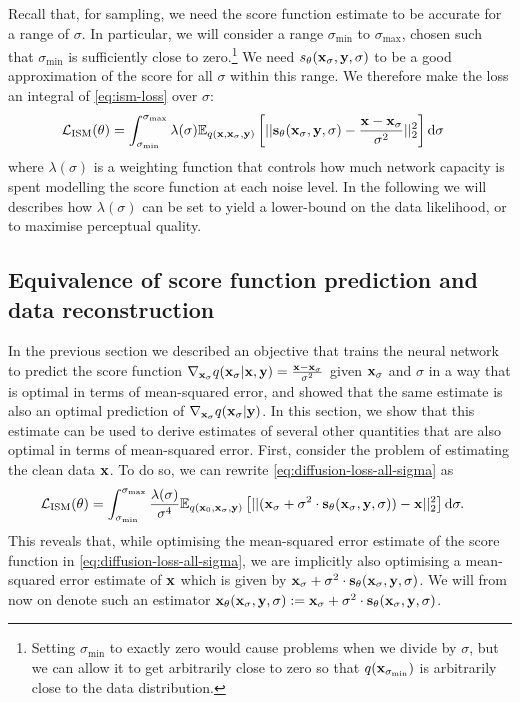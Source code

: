Recall that, for sampling, we need the score function estimate to be accurate for a range of $\sigma$. In particular, we will consider a range $\sigma_\text{min}$ to $\sigma_\text{max}$, chosen such that $\sigma_\text{min}$ is sufficiently close to zero.\footnote{Setting $\sigma_\text{min}$ to exactly zero would cause problems when we divide by $\sigma$, but we can allow it to get arbitrarily close to zero so that $q({\mathbf{x}}_{\sigma_\text{min}})$ is arbitrarily close to the data distribution.} We need $s_\theta({\mathbf{x}}_\sigma, {\mathbf{y}}, \sigma)$ to be a good approximation of the score for all $\sigma$ within this range. We therefore make the loss an integral of \cref{eq:ism-loss} over $\sigma$:
\begin{align} \label{eq:diffusion-loss-all-sigma}
    \mathcal{L}_\text{ISM}(\theta) &= \int_{\sigma_\text{min}}^{\sigma_\text{max}} \lambda(\sigma) \mathbb{E}_{q({\mathbf{x}}, {\mathbf{x}}_\sigma, {\mathbf{y}})} \left[ 
    || {\mathbf{s}}_\theta({\mathbf{x}}_\sigma, {\mathbf{y}}, \sigma) - \frac{{\mathbf{x}}-{\mathbf{x}}_\sigma}{\sigma^2} ||_2^2 \right] \mathrm{d}\sigma
\end{align}
where $\lambda(\sigma)$ is a weighting function that controls how much network capacity is spent modelling the score function at each noise level. In the following we will describes how $\lambda(\sigma)$ can be set to yield a lower-bound on the data likelihood, or to maximise perceptual quality.

\subsection{Equivalence of score function prediction and data reconstruction} \label{eq:equivalent-parameterisations}
In the previous section we described an objective that trains the neural network to predict the score function $\nabla_{{\mathbf{x}}_\sigma} q({\mathbf{x}}_\sigma|{\mathbf{x}},{\mathbf{y}}) = \frac{{\mathbf{x}}-{\mathbf{x}}_\sigma}{\sigma^2}$ given ${\mathbf{x}}_\sigma$ and $\sigma$ in a way that is optimal in terms of mean-squared error, and showed that the same estimate is also an optimal prediction of $\nabla_{{\mathbf{x}}_\sigma} q({\mathbf{x}}_\sigma|{\mathbf{y}})$. In this section, we show that this estimate can be used to derive estimates of several other quantities that are also optimal in terms of mean-squared error. First, consider the problem of estimating the clean data ${\mathbf{x}}$. To do so, we can rewrite \cref{eq:diffusion-loss-all-sigma} as
\begin{align} \label{eq:x0-diffusion-loss}
    \mathcal{L}_\text{ISM}(\theta) &= \int_{\sigma_\text{min}}^{\sigma_\text{max}} \frac{\lambda(\sigma)}{\sigma^4} \mathbb{E}_{q({\mathbf{x}}_0, {\mathbf{x}}_\sigma, {\mathbf{y}})} \left[ 
    || ({\mathbf{x}}_\sigma + \sigma^2 \cdot {\mathbf{s}}_\theta({\mathbf{x}}_\sigma, {\mathbf{y}}, \sigma)) - {\mathbf{x}} ||_2^2 \right] \mathrm{d}\sigma.
\end{align}
This reveals that, while optimising the mean-squared error estimate of the score function in \cref{eq:diffusion-loss-all-sigma}, we are implicitly also optimising a mean-squared error estimate of ${\mathbf{x}}$ which is given by ${\mathbf{x}}_\sigma + \sigma^2 \cdot {\mathbf{s}}_\theta({\mathbf{x}}_\sigma, {\mathbf{y}}, \sigma)$. We will from now on denote such an estimator ${\mathbf{x}}_\theta({\mathbf{x}}_\sigma, {\mathbf{y}}, \sigma) := {\mathbf{x}}_\sigma + \sigma^2 \cdot {\mathbf{s}}_\theta({\mathbf{x}}_\sigma, {\mathbf{y}}, \sigma)$.

